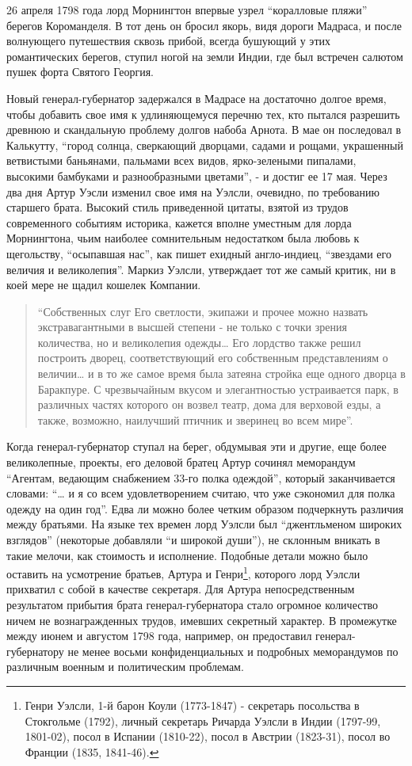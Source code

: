 \documentclass[
  oneside,
  12pt,
  titlepage]{book}
\begin{document}
26 апреля 1798 года лорд Морнингтон впервые узрел ``коралловые пляжи'' берегов Короманделя. В тот день он бросил якорь, видя дороги Мадраса, и после волнующего путешествия сквозь прибой, всегда бушующий у этих романтических берегов, ступил ногой на земли Индии, где был встречен салютом пушек форта Святого Георгия.

Новый генерал-губернатор задержался в Мадрасе на достаточно долгое время, чтобы добавить свое имя к удлиняющемуся перечню тех, кто пытался разрешить древнюю и скандальную проблему долгов набоба Арнота. В мае он последовал в Калькутту, ``город солнца, сверкающий дворцами, садами и рощами, украшенный ветвистыми баньянами, пальмами всех видов, ярко-зелеными пипалами, высокими бамбуками и разнообразными цветами'', - и достиг ее 17 мая. Через два дня Артур Уэсли изменил свое имя на Уэлсли, очевидно, по требованию старшего брата. Высокий стиль приведенной цитаты, взятой из трудов современного событиям историка, кажется вполне уместным для лорда Морнингтона, чьим наиболее сомнительным недостатком была любовь к щегольству, ``осыпавшая нас'', как пишет ехидный англо-индиец, ``звездами его величия и великолепия''. Маркиз Уэлсли, утверждает тот же самый критик, ни в коей мере не щадил кошелек Компании.

\begin{quote}
``Собственных слуг Его светлости, экипажи и прочее можно назвать экстравагантными в высшей степени - не только с точки зрения количества, но и великолепия одежды\ldots{} Его лордство также решил построить дворец, соответствующий его собственным представлениям о величии\ldots{} и в то же самое время была затеяна стройка еще одного дворца в Баракпуре. С чрезвычайным вкусом и элегантностью устраивается парк, в различных частях которого он возвел театр, дома для верховой езды, а также, возможно, наилучший птичник и зверинец во всем мире''.
\end{quote}

Когда генерал-губернатор ступал на берег, обдумывая эти и другие, еще более великолепные, проекты, его деловой братец Артур сочинял меморандум ``Агентам, ведающим снабжением 33-го полка одеждой'', который заканчивается словами: ``\ldots{} и я со всем удовлетворением считаю, что уже сэкономил для полка одежду на один год''. Едва ли можно более четким образом подчеркнуть различия между братьями. На языке тех времен лорд Уэлсли был ``джентльменом широких взглядов'' (некоторые добавляли ``и широкой души''), не склонным вникать в такие мелочи, как стоимость и исполнение. Подобные детали можно было оставить на усмотрение братьев, Артура и Генри\footnote{Генри Уэлсли, 1-й барон Коули (1773-1847) - секретарь посольства в Стокгольме (1792), личный секретарь Ричарда Уэлсли в Индии (1797-99, 1801-02), посол в Испании (1810-22), посол в Австрии (1823-31), посол во Франции (1835, 1841-46).}, которого лорд Уэлсли прихватил с собой в качестве секретаря. Для Артура непосредственным результатом прибытия брата генерал-губернатора стало огромное количество ничем не вознагражденных трудов, имевших секретный характер. В промежутке между июнем и августом 1798 года, например, он предоставил генерал-губернатору не менее восьми конфиденциальных и подробных меморандумов по различным военным и политическим проблемам.
\end{document}
